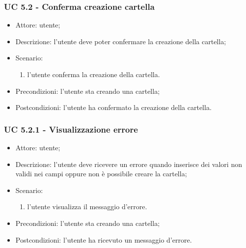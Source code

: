     \subsubsection{UC 5.2 - Conferma creazione cartella}
    \begin{itemize}
        \item Attore: utente;
        \item Descrizione: l'utente deve poter confermare la creazione della cartella;
        \item Scenario:
        \begin{enumerate}
        \item l'utente conferma la creazione della cartella.
        \end{enumerate}
        \item Precondizioni: l'utente sta creando una cartella;
        \item Postcondizioni: l'utente ha confermato la creazione della cartella.
    \end{itemize}

    \subsubsection{UC 5.2.1 - Visualizzazione errore }
    \begin{itemize}
        \item Attore: utente;
        \item Descrizione: l'utente deve ricevere un errore quando inserisce dei valori non validi nei campi oppure non è possibile creare la cartella;
        \item Scenario:
        \begin{enumerate}
        \item l'utente visualizza il messaggio d'errore.
        \end{enumerate}   
        \item Precondizioni: l'utente sta creando una cartella;
        \item Postcondizioni: l'utente ha ricevuto un messaggio d'errore.
    \end{itemize}

